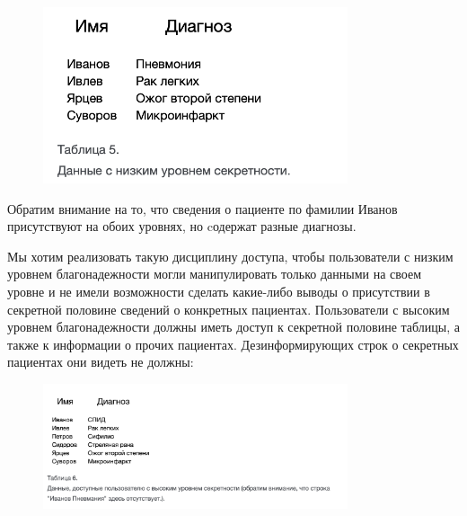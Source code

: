 \begin{figure}[h]
    \centering
    \includegraphics[width=0.8\textwidth]{assets/dick_pic2.png}
\end{figure}

Обратим внимание на то, что сведения о пациенте по фамилии Иванов присутствуют на обоих уровнях, но cодержат разные диагнозы.

Мы хотим реализовать такую дисциплину доступа, чтобы пользователи с низким уровнем благонадежности могли манипулировать только данными на своем уровне и не имели возможности сделать какие-либо выводы о присутствии в секретной половине сведений о конкретных пациентах. Пользователи с высоким уровнем благонадежности должны иметь доступ к секретной половине таблицы, а также к информации о прочих пациентах. Дезинформирующих строк о секретных пациентах они видеть не должны:

\begin{figure}[h]
    \centering
    \includegraphics[width=0.8\textwidth]{assets/dick_pic3.png}
\end{figure}

